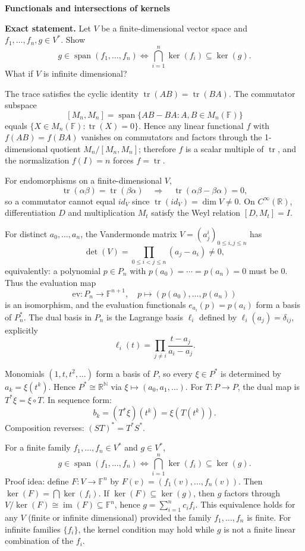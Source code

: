 \begin{problem}[CP-I-0087]
\label{prob:cp-i-0087}
\textbf{Functionals and intersections of kernels}

\textbf{Exact statement.}
\hspace*{1.5em}Let \(V\) be a finite-dimensional vector space and \(f_1,\dots,f_n,g\in V^*\).
Show
\[
g\in \operatorname{span}(f_1,\dots,f_n)
\iff
\bigcap_{i=1}^n \ker(f_i)\subseteq \ker(g).
\]
What if \(V\) is infinite dimensional?



The trace satisfies the cyclic identity \(\operatorname{tr}(AB)=\operatorname{tr}(BA)\).
The commutator subspace
\[
[M_n,M_n]=\operatorname{span}\{AB-BA:A,B\in M_n(\mathbb F)\}
\]
equals \(\{X\in M_n(\mathbb F):\operatorname{tr}(X)=0\}\). Hence any linear functional \(f\) with \(f(AB)=f(BA)\) vanishes on
commutators and factors through the 1-dimensional quotient \(M_n/[M_n,M_n]\); therefore \(f\) is a scalar multiple of \(\operatorname{tr}\),
and the normalization \(f(I)=n\) forces \(f=\operatorname{tr}\).

For endomorphisms on a finite-dimensional \(V\),
\[
\operatorname{tr}(\alpha\beta)=\operatorname{tr}(\beta\alpha)\quad\Rightarrow\quad \operatorname{tr}(\alpha\beta-\beta\alpha)=0,
\]
so a commutator cannot equal \(id_V\) since \(\operatorname{tr}(id_V)=\dim V\neq0\).
On \(C^\infty(\mathbb R)\), differentiation \(D\) and multiplication \(M_t\) satisfy the Weyl relation
\([D,M_t]=I\).

For distinct \(a_0,\dots,a_n\), the Vandermonde matrix \(V=(a_j^i)_{0\le i,j\le n}\) has
\[
\det(V)=\prod_{0\le i<j\le n}(a_j-a_i)\neq 0,
\]
equivalently: a polynomial \(p\in P_n\) with \(p(a_0)=\cdots=p(a_n)=0\) must be \(0\).
Thus the evaluation map
\[
\mathrm{ev}:P_n\to \mathbb F^{n+1},\quad p\mapsto (p(a_0),\dots,p(a_n))
\]
is an isomorphism, and the evaluation functionals \(e_{a_i}(p)=p(a_i)\) form a basis of \(P_n^*\).
The dual basis in \(P_n\) is the Lagrange basis \(\ell_i\) defined by \(\ell_i(a_j)=\delta_{ij}\), explicitly
\[
\ell_i(t)=\prod_{j\ne i}\frac{t-a_j}{a_i-a_j}.
\]

Monomials \((1,t,t^2,\dots)\) form a basis of \(P\), so every \(\xi\in P^*\) is determined by \(a_k=\xi(t^k)\).
Hence \(P^*\cong \mathbb R^{\mathbb N}\) via \(\xi\mapsto (a_0,a_1,\dots)\).
For \(T:P\to P\), the dual map is \(T^*\xi=\xi\circ T\). In sequence form:
\[
b_k=(T^*\xi)(t^k)=\xi(T(t^k)).
\]
Composition reverses: \((ST)^*=T^*S^*\).

For a finite family \(f_1,\dots,f_n\in V^*\) and \(g\in V^*\),
\[
g\in \operatorname{span}(f_1,\dots,f_n)
\iff
\bigcap_{i=1}^n \ker(f_i)\subseteq \ker(g).
\]
Proof idea: define \(F:V\to\mathbb F^n\) by \(F(v)=(f_1(v),\dots,f_n(v))\). Then \(\ker(F)=\bigcap\ker(f_i)\).
If \(\ker(F)\subseteq\ker(g)\), then \(g\) factors through \(V/\ker(F)\cong \operatorname{im}(F)\subseteq\mathbb F^n\), hence
\(g=\sum_{i=1}^n c_i f_i\).
This equivalence holds for any \(V\) (finite or infinite dimensional) provided the family \(f_1,\dots,f_n\) is finite.
For infinite families \(\{f_i\}\), the kernel condition may hold while \(g\) is not a finite linear combination of the \(f_i\).


\end{problem}
